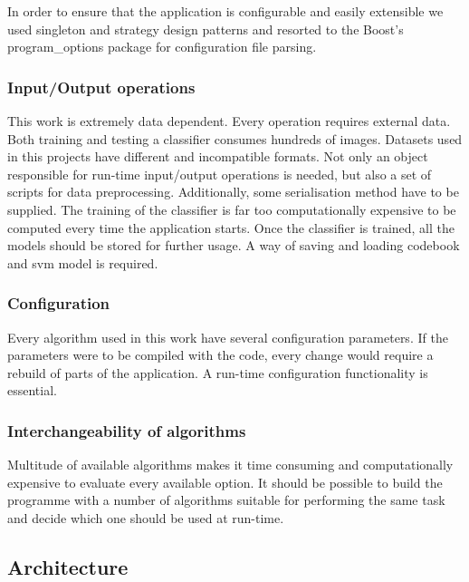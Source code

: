 	In order to ensure that the application is configurable and easily extensible we used singleton and strategy design patterns and resorted to the Boost's program\_options package for configuration file parsing.
	
		\subsubsection{Input/Output operations}	
		This work is extremely data dependent. Every operation requires external data. Both training and testing a classifier consumes hundreds of images. Datasets used in this projects have different and incompatible formats. Not only an object responsible for run-time input/output operations is needed, but also a set of scripts for data preprocessing. Additionally, some serialisation method have to be supplied. The training of the classifier is far too computationally expensive to be computed every time the application starts. Once the classifier is trained, all the models should be stored for further usage. A way of saving and loading codebook and svm model is required. 
		
		\subsubsection{Configuration}		
		Every algorithm used in this work have several configuration parameters. If the parameters were to be compiled with the code, every change would require a rebuild of parts of the application. A run-time configuration functionality is essential. 
		
		\subsubsection{Interchangeability of algorithms}		
		Multitude of available algorithms makes it time consuming and computationally expensive to evaluate every available option. It should be possible to build the programme with a number of algorithms suitable for performing the same task and decide which one should be used at run-time.
		
	\subsection{Architecture}
	
